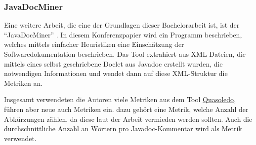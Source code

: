 \subsubsection{JavaDocMiner}
Eine weitere Arbeit, die eine der Grundlagen dieser Bachelorarbeit ist, ist der \enquote{JavaDocMiner} \cite[S.~68-79]{AutomaticQualityAssessmentofSourceCodeComments:TheJavadocMiner}. In diesem Konferenzpapier wird ein Programm beschrieben, welches mittels einfacher Heuristiken eine Einschätzung der Softwaredokumentation beschrieben. Das Tool extrahiert aus XML-Dateien, die mittels eines selbst geschriebene Doclet aus Javadoc erstellt wurden, die notwendigen Informationen und wendet dann auf diese XML-Struktur die Metriken an. 

Insgesamt verwendeten die Autoren viele Metriken aus dem Tool \hyperref[chapter:Quasoledo]{Quasoledo}, führen aber neue auch Metriken ein. dazu gehört eine Metrik, welche Anzahl der Abkürzungen zählen, da diese laut der Arbeit vermieden werden sollten. Auch die durchschnittliche Anzahl an Wörtern pro Javadoc-Kommentar wird als Metrik verwendet. 

